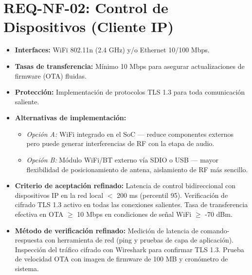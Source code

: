 \documentclass[%
	paper=a4,
	twoside=false,
	parskip=half,
	chapterprefix=false,
	10pt,
	headings=normal,
	bibliography=totoc,
	listof=totoc,
	titlepage=on,
	captions=tableabove,
	draft=false,
]{scrbook}%
\begin{document}
\section{REQ-NF-02: Control de Dispositivos (Cliente IP)}
\begin{itemize}
    \item \textbf{Interfaces:} WiFi 802.11n (2.4 GHz) y/o Ethernet 10/100 Mbps.
    \item \textbf{Tasas de transferencia:} Mínimo 10 Mbps para asegurar actualizaciones de firmware (OTA) fluidas.
    \item \textbf{Protección:} Implementación de protocolos TLS 1.3 para toda comunicación saliente.
    \item \textbf{Alternativas de implementación:}
        \begin{itemize}
            \item \textit{Opción A:} WiFi integrado en el SoC — reduce componentes externos pero puede generar interferencias de RF con la etapa de audio.
            \item \textit{Opción B:} Módulo WiFi/BT externo vía SDIO o USB — mayor flexibilidad de posicionamiento de antena, aislamiento de RF más sencillo.
        \end{itemize}
    \item \textbf{Criterio de aceptación refinado:} Latencia de control bidireccional con dispositivos IP en la red local $<$ 200 ms (percentil 95). Verificación de cifrado TLS 1.3 activo en todas las conexiones salientes. Tasa de transferencia efectiva en OTA $\geq$ 10 Mbps en condiciones de señal WiFi $\geq$ -70 dBm.
    \item \textbf{Método de verificación refinado:} Medición de latencia de comando-respuesta con herramienta de red (ping y pruebas de capa de aplicación). Inspección del tráfico cifrado con Wireshark para confirmar TLS 1.3. Prueba de velocidad OTA con imagen de firmware de 100 MB y cronómetro de sistema.
\end{itemize}

\end{document}
